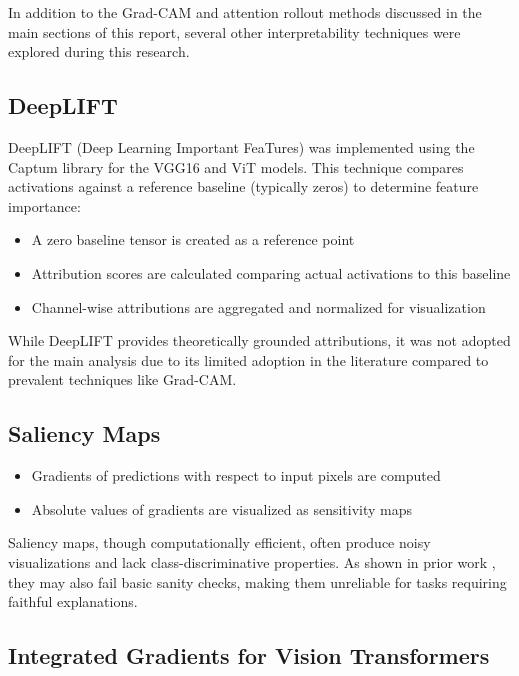 \documentclass[a4paper,12pt]{report}
\begin{document}
In addition to the Grad-CAM and attention rollout methods discussed in the main sections of this report, several other interpretability techniques were explored during this research.

\subsection{DeepLIFT}

DeepLIFT (Deep Learning Important FeaTures) was implemented using the Captum library for the VGG16 and ViT models. This technique compares activations against a reference baseline (typically zeros) to determine feature importance:

\begin{itemize}
\item A zero baseline tensor is created as a reference point
\item Attribution scores are calculated comparing actual activations to this baseline
\item Channel-wise attributions are aggregated and normalized for visualization
\end{itemize}

While DeepLIFT provides theoretically grounded attributions, it was not adopted for the main analysis due to its limited adoption in the literature compared to prevalent techniques like Grad-CAM.

\subsection{Saliency Maps}

\begin{itemize}
\item Gradients of predictions with respect to input pixels are computed
\item Absolute values of gradients are visualized as sensitivity maps
\end{itemize}

Saliency maps, though computationally efficient, often produce noisy visualizations and lack class-discriminative properties. As shown in prior work \citep{Adebayo2018}, they may also fail basic sanity checks, making them unreliable for tasks requiring faithful explanations.

\subsection{Integrated Gradients for Vision Transformers}
\end{document}
